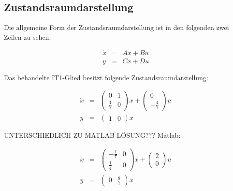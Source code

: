 \subsection{Zustandsraumdarstellung}

Die allgemeine Form der Zustandsraumdarstellung ist in den folgenden zwei Zeilen zu sehen.

\begin{eqnarray*}
	\dot x &=& Ax + Bu \nonumber \\
	y &=& Cx + Du
\end{eqnarray*}

Das behandelte IT1-Glied besitzt folgende Zustandsraumdarstellung:

\begin{eqnarray*}
	\dot x &=& \left(\begin{array}{cc} 0 & 1\\ \frac{1}{7} & 0\end{array}\right) x + \left(\begin{array}{c} 0\\ -\frac{4}{7}\end{array}\right) u  \nonumber \\
	y &=& \left(\begin{array}{cc} 1 & 0\end{array}\right) x
\end{eqnarray*}


UNTERSCHIEDLICH ZU MATLAB LÖSUNG???
Matlab:

\begin{eqnarray*}
	\dot x &=& \left(\begin{array}{cc} -\frac{1}{7} & 0\\ \frac{1}{4} & 0\end{array}\right) x + \left(\begin{array}{c} 2\\ 0\end{array}\right) u  \nonumber \\
	y &=& \left(\begin{array}{cc} 0 & \frac{8}{7}\end{array}\right) x
\end{eqnarray*}